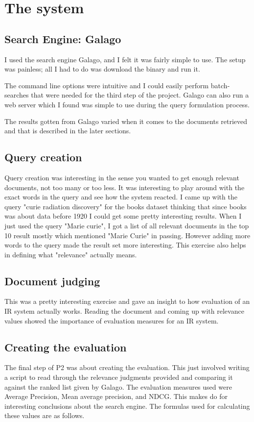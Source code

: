 \documentclass[12pt,letterpaper]{article}
\begin{document}
\section*{The system}
\subsection*{Search Engine: Galago}
I used the search engine Galago, and I felt it was fairly simple to use. The setup was painless; all I had to do was download the binary and run it.

The command line options were intuitive and I could easily perform batch-searches that were needed for the third step of the project. Galago can also run a web server which I found was simple to use during the query formulation process.

The results gotten from Galago varied when it comes to the documents retrieved and that is described in the later sections.  

\subsection*{Query creation}
Query creation was interesting in the sense you wanted to get enough relevant documents, not too many or too less. It was interesting to play around with the exact words in the query and see how the system reacted. I came up with the query "curie radiation discovery" for the books dataset thinking that since books was about data before 1920 I could get some pretty interesting results. When I just used the query "Marie curie", I got a list of all relevant documents in the top 10 result mostly which mentioned "Marie Curie" in passing. However adding more words to the query made the result set more interesting. This exercise also helps in defining what "relevance" actually means.

\subsection*{Document judging}
This was a pretty interesting exercise and gave an insight to how evaluation of an IR system actually works. Reading the document and coming up with relevance values showed the importance of evaluation measures for an IR system.  

\subsection*{Creating the evaluation}
The final step of P2 was about creating the evaluation. This just involved writing a script to read through the relevance judgments provided and comparing it against the ranked list given by Galago. The evaluation measures used were Average Precision, Mean average precision, and NDCG. This makes do for interesting conclusions about the search engine. The formulas used for calculating these values are as follows. 
\end{document}
